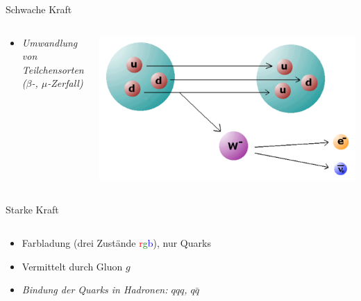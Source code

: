 \documentclass{beamer}
\begin{document}
\begin{frame}
\begin{block}{Schwache Kraft}
\begin{columns}[T]
\begin{column}{0.7\textwidth}
\begin{itemize}
        \item \textit{Umwandlung von Teilchensorten ($\beta$-, $\mu$-Zerfall)}
        \end{itemize}
      \end{column}
      \begin{column}{0.3\textwidth}
        \centering
        \vskip-0.3cm
        \includegraphics[height=0.22\textheight]{sm/BetaZerfall.pdf}
      \end{column}
    \end{columns}
  \end{block}
  \pause
  \begin{block}{Starke Kraft}
    \begin{columns}[T]
      \begin{column}{0.7\textwidth}
        \begin{itemize}
        \item Farbladung (drei Zust\"ande \textcolor{red}{r}\textcolor{green}{g}\textcolor{blue}{b}), nur Quarks
        \item Vermittelt durch Gluon $g$
        \item \textit{Bindung der Quarks in Hadronen: $qqq$, $q\bar{q}$}
       \end{itemize}
      \end{column}
      \begin{column}{0.3\textwidth}
        \centering
        \vskip-0.3cm

\end{column}
\end{columns}
\end{block}
\end{frame}
\end{document}
